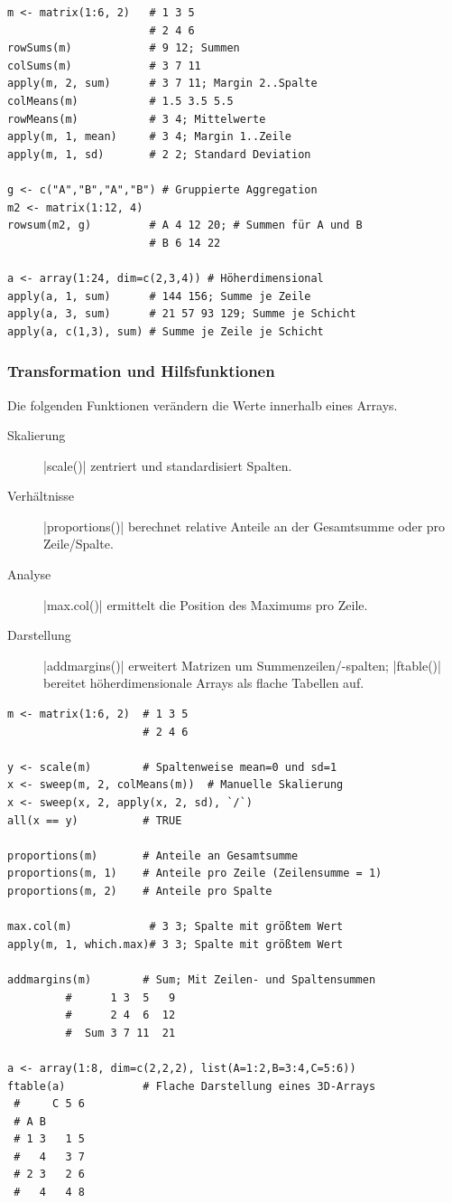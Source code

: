 \documentclass[10pt,twocolumn]{scrartcl}
\renewcommand{\lstinline}{\mycoloredinline}
\begin{document}
\begin{lstlisting}
m <- matrix(1:6, 2)   # 1 3 5
                      # 2 4 6
rowSums(m)            # 9 12; Summen
colSums(m)            # 3 7 11
apply(m, 2, sum)      # 3 7 11; Margin 2..Spalte
colMeans(m)           # 1.5 3.5 5.5
rowMeans(m)           # 3 4; Mittelwerte
apply(m, 1, mean)     # 3 4; Margin 1..Zeile
apply(m, 1, sd)       # 2 2; Standard Deviation

g <- c("A","B","A","B") # Gruppierte Aggregation
m2 <- matrix(1:12, 4)
rowsum(m2, g)         # A 4 12 20; # Summen für A und B
                      # B 6 14 22

a <- array(1:24, dim=c(2,3,4)) # Höherdimensional
apply(a, 1, sum)      # 144 156; Summe je Zeile
apply(a, 3, sum)      # 21 57 93 129; Summe je Schicht
apply(a, c(1,3), sum) # Summe je Zeile je Schicht
\end{lstlisting}


\subsubsection{Transformation und Hilfsfunktionen}

Die folgenden Funktionen verändern die Werte innerhalb eines Arrays.

\begin{description}
\item[Skalierung] \lstinline|scale()| zentriert und standardisiert Spalten.
\item[Verhältnisse] \lstinline|proportions()| berechnet relative Anteile an der Gesamtsumme oder pro Zeile/Spalte.
\item[Analyse] \lstinline|max.col()| ermittelt die Position des Maximums pro Zeile.
\item[Darstellung] \lstinline|addmargins()| erweitert Matrizen um Summenzeilen/-spalten; \lstinline|ftable()| bereitet höherdimensionale Arrays als flache Tabellen auf.
\end{description}

\begin{lstlisting}
m <- matrix(1:6, 2)  # 1 3 5
                     # 2 4 6

y <- scale(m)        # Spaltenweise mean=0 und sd=1
x <- sweep(m, 2, colMeans(m))  # Manuelle Skalierung
x <- sweep(x, 2, apply(x, 2, sd), `/`)
all(x == y)          # TRUE

proportions(m)       # Anteile an Gesamtsumme
proportions(m, 1)    # Anteile pro Zeile (Zeilensumme = 1)
proportions(m, 2)    # Anteile pro Spalte

max.col(m)            # 3 3; Spalte mit größtem Wert
apply(m, 1, which.max)# 3 3; Spalte mit größtem Wert

addmargins(m)        # Sum; Mit Zeilen- und Spaltensummen
         #      1 3  5   9
         #      2 4  6  12
         #  Sum 3 7 11  21

a <- array(1:8, dim=c(2,2,2), list(A=1:2,B=3:4,C=5:6))
ftable(a)            # Flache Darstellung eines 3D-Arrays
 #     C 5 6
 # A B      
 # 1 3   1 5
 #   4   3 7
 # 2 3   2 6
 #   4   4 8
\end{lstlisting}
\end{document}
